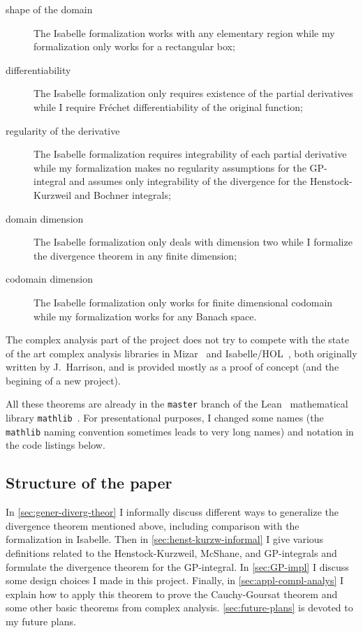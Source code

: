 \documentclass[a4paper, UKenglish,cleveref, autoref, thm-restate]{lipics-v2021}
\begin{document}
\begin{description}
\item[shape of the domain] The Isabelle formalization works with any
  elementary region while my formalization only works for a
  rectangular box;
\item[differentiability] The Isabelle formalization only requires
  existence of the partial derivatives while I require Fréchet
  differentiability of the original function;
\item[regularity of the derivative] The Isabelle formalization requires
  integrability of each partial derivative while my formalization
  makes no regularity assumptions for the GP-integral and assumes only
  integrability of the divergence for the Henstock-Kurzweil and
  Bochner integrals;
\item[domain dimension] The Isabelle formalization only deals with
  dimension two while I formalize the divergence theorem in any finite
  dimension;
\item[codomain dimension] The Isabelle formalization only works for
  finite dimensional codomain while my formalization works for any
  Banach space.
\end{description}

The complex analysis part of the project does not try to compete with
the state of the art complex analysis libraries in
Mizar~\cite{harrison-mizar} and Isabelle/HOL~\cite{harrison-hol}, both
originally written by J.~Harrison, and is provided mostly as a proof
of concept (and the begining of a new project).

All these theorems are already in the \texttt{master} branch of the
Lean~\cite{10.1007/978-3-319-21401-6_26} mathematical library
\texttt{mathlib}~\cite{mathlib20}. For presentational purposes, I
changed some names (the \texttt{mathlib} naming convention sometimes
leads to very long names) and notation in the code listings below.


\subsection{Structure of the paper}%
\label{sec:structure-paper}

In \autoref{sec:gener-diverg-theor} I informally discuss different
ways to generalize the divergence theorem mentioned above, including
comparison with the formalization in Isabelle. Then in
\autoref{sec:henst-kurzw-informal} I give various definitions related
to the Henstock-Kurzweil, McShane, and GP-integrals and formulate the
divergence theorem for the GP-integral. In \autoref{sec:GP-impl} I
discuss some design choices I made in this project. Finally, in
\autoref{sec:appl-compl-analys} I explain how to apply this theorem to
prove the Cauchy-Goursat theorem and some other basic theorems from
complex analysis. \autoref{sec:future-plans} is devoted to my future
plans.
\end{document}
